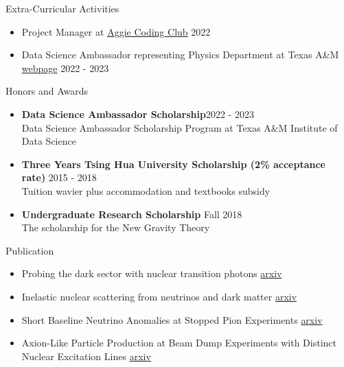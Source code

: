 \documentclass{resume}
\begin{document}
\begin{rSection}{Extra-Curricular Activities}
    \begin{itemize}
        \item Project Manager at \href{https://aggiecodingclub.com/}{Aggie Coding Club} \hfill 2022
        \item Data Science Ambassador representing Physics Department at Texas A\&M \href{https://noctildon.github.io/DS_ambassador/index.html}{webpage} \hfill 2022 - 2023
    \end{itemize}
\end{rSection}


\begin{rSection}{Honors and Awards}
    \begin{itemize}
        \item \textbf{Data Science Ambassador Scholarship}\hfill 2022 - 2023\\
        Data Science Ambassador Scholarship Program at Texas A\&M Institute of Data Science
        \item \textbf{Three Years Tsing Hua University Scholarship (2\% acceptance rate)} \hfill 2015 - 2018 \\
        Tuition wavier plus accommodation and textbooks subsidy
        \item \textbf{Undergraduate Research Scholarship} \hfill Fall 2018 \\
        The scholarship for the New Gravity Theory
    \end{itemize}
\end{rSection}

\begin{rSection}{Publication}
    \begin{itemize}
        \item Probing the dark sector with nuclear transition photons \hfill \href{https://arxiv.org/pdf/2302.10250.pdf}{arxiv}
        \item Inelastic nuclear scattering from neutrinos and dark matter \hfill \href{https://arxiv.org/pdf/2206.08590.pdf}{arxiv}
        \item Short Baseline Neutrino Anomalies at Stopped Pion Experiments \hfill \href{https://arxiv.org/abs/2310.13194}{arxiv}
        \item Axion-Like Particle Production at Beam Dump Experiments with Distinct Nuclear Excitation Lines \hfill \href{https://arxiv.org/pdf/2207.13659.pdf}{arxiv}
    \end{itemize}
\end{rSection}
\end{document}
